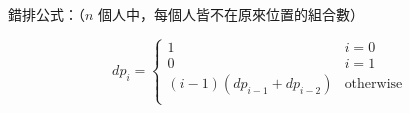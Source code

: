 錯排公式：（$n$ 個人中，每個人皆不在原來位置的組合數）

$$
dp_i = \begin{cases}
    1 & i=0 \\
    0 & i=1 \\
    (i-1) (dp_{i-1}+dp_{i-2}) & \text{otherwise}\\
\end{cases}
$$